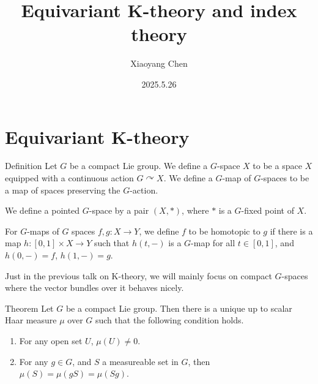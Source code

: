 \documentclass{beamer}
\title{Equivariant K-theory and index theory}
\author{Xiaoyang Chen}
\date{2025.5.26}
\newcommand{\act}{\curvearrowright}
\begin{document}
\begin{frame}
	\maketitle
\end{frame}

\section{Equivariant K-theory}

\begin{frame}
	\begin{block}{Definition}
		Let $G$ be a compact Lie group. We define a $G$-space $X$ to be a space $X$ equipped with a continuous action $G\act X$. We define a $G$-map of $G$-spaces to be a map of spaces preserving the $G$-action. 

		We define a pointed $G$-space by a pair $(X,*)$, where $*$ is a $G$-fixed point of $X$. 

		For $G$-maps of $G$ spaces $f,g:X\to Y$, we define $f$ to be homotopic to $g$ if there is a map $h:[0,1]\times X\to Y$ such that $h(t,-)$ is a $G$-map for all $t\in[0,1]$, and $h(0,-)=f$, $h(1,-)=g$. 

		Just in the previous talk on K-theory, we will mainly focus on compact $G$-spaces where the vector bundles over it behaves nicely. 
	\end{block}
\end{frame}

\begin{frame}
	\begin{alertblock}{Theorem}
		Let $G$ be a compact Lie group. Then there is a unique up to scalar Haar measure $\mu$ over $G$ such that the following condition holds. 
		\begin{enumerate}
			\item For any open set $U$, $\mu(U)\neq0$. 
			\item For any $g\in G$, and $S$ a measureable set in $G$, then $\mu(S)=\mu(gS)=\mu(Sg)$. 
		\end{enumerate}
	\end{alertblock}
\end{frame}
\end{document}
